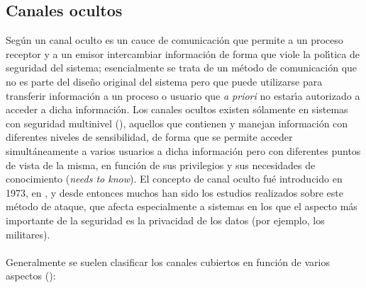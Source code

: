\subsection{Canales ocultos}
Seg\'un \cite{kn:glo} un canal oculto es un cauce de comunicaci\'on que permite
a un proceso receptor y a un emisor intercambiar informaci\'on de forma que
viole la pol\'{\i}tica de seguridad del sistema; esencialmente se trata de un
m\'etodo de comunicaci\'on que no es parte del dise\~no original del sistema 
pero que puede utilizarse para transferir informaci\'on a un proceso o usuario
que {\it a priori} no estar\'{\i}a autorizado a acceder a dicha informaci\'on. 
Los canales ocultos existen s\'olamente en sistemas con seguridad multinivel
(\cite{kn:pro92}), aquellos que contienen y manejan informaci\'on con
diferentes niveles de sensibilidad, de forma que se permite acceder 
simult\'aneamente a varios usuarios a dicha informaci\'on pero con diferentes 
puntos de vista de la misma, en funci\'on de sus privilegios y sus necesidades 
de conocimiento ({\it needs to know}). El concepto de canal oculto
fu\'e introducido en 1973, en \cite{kn:lam73}, y desde entonces muchos han 
sido los estudios realizados sobre este m\'etodo de ataque, que afecta 
especialmente a sistemas en los que el aspecto m\'as importante de la seguridad
es la privacidad de los datos (por ejemplo, los militares).\\
\\Generalmente se suelen clasificar los canales cubiertos en funci\'on de 
varios aspectos (\cite{kn:gli93}):
